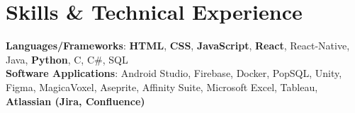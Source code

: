 \documentclass[letterpaper,11pt]{article}
\begin{document}
\section{Skills \& Technical Experience}
\begin{itemize}[leftmargin=0.15in, label={}]
  \small{\item{
  \vspace{1mm}
    \textbf{Languages/Frameworks}{: \textbf{HTML}, \textbf{CSS}, \textbf{JavaScript}, \textbf{React}, React-Native, Java, \textbf{Python}, C, C\#, SQL} \\
    \vspace{1mm}
    \textbf{Software Applications}{: Android Studio, Firebase, Docker, PopSQL, Unity, Figma, MagicaVoxel, Aseprite, Affinity Suite, Microsoft Excel, Tableau, \textbf{Atlassian (Jira, Confluence)}} \\
  }}
\end{itemize}





\end{document}
